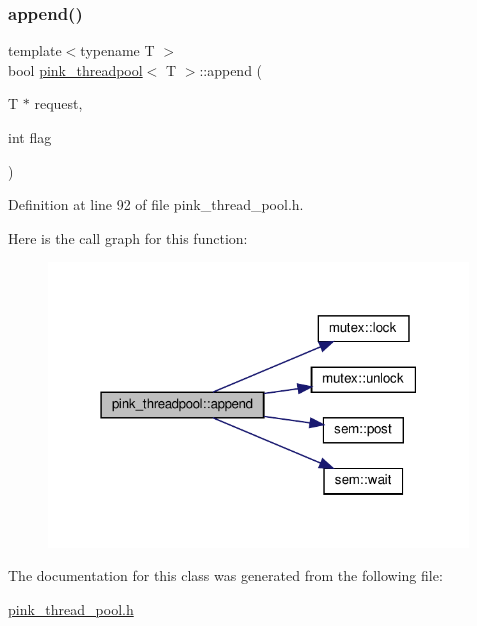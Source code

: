 \subsubsection{\texorpdfstring{append()}{append()}}
{\footnotesize\ttfamily template$<$typename T $>$ \\
bool \hyperlink{classpink__threadpool}{pink\+\_\+threadpool}$<$ T $>$\+::append (\begin{DoxyParamCaption}\item[{T $\ast$}]{request,  }\item[{int}]{flag }\end{DoxyParamCaption})}



Definition at line 92 of file pink\+\_\+thread\+\_\+pool.\+h.

Here is the call graph for this function\+:\nopagebreak
\begin{figure}[H]
\begin{center}
\leavevmode
\includegraphics[width=316pt]{classpink__threadpool_ae4bead5c98203b97c3caeae43296d295_cgraph}
\end{center}
\end{figure}


The documentation for this class was generated from the following file\+:\begin{DoxyCompactItemize}
\item 
\hyperlink{pink__thread__pool_8h}{pink\+\_\+thread\+\_\+pool.\+h}\end{DoxyCompactItemize}
